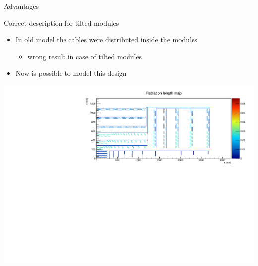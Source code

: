 \documentclass[pdftex, 11pt]{beamer}
\begin{document}
\begin{frame}{Advantages}
  \begin{block}{Correct description for \alert{tilted} modules}
    \begin{itemize}
    \item In old model the cables were distributed \alert{inside} the modules
      \begin{itemize}
      \item \alert{wrong} result in case of tilted modules
      \end{itemize}
    \item Now is \alert{possible} to model this design
    \end{itemize}
  \end{block}
  \begin{center}
    \includegraphics[width=\textwidth]{img/tilted.pdf}
  \end{center}
\end{frame}
\end{document}
